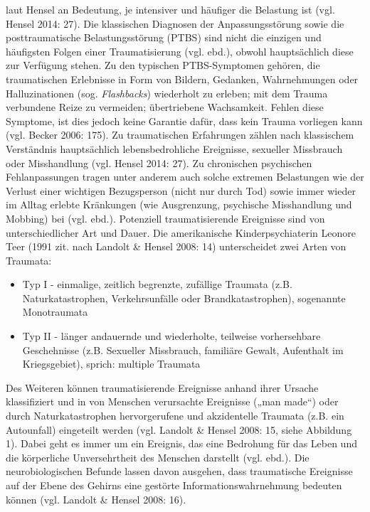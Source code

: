 laut Hensel an Bedeutung, je intensiver und häufiger die Belastung ist (vgl. Hensel 2014: 27). Die klassischen Diagnosen der Anpassungsstörung sowie die posttraumatische Belastungsstörung (PTBS) sind nicht die einzigen und häufigsten Folgen einer Traumatisierung (vgl. ebd.), obwohl hauptsächlich diese zur Verfügung stehen. Zu den typischen PTBS-Symptomen gehören, die traumatischen Erlebnisse in Form von Bildern, Gedanken, Wahrnehmungen oder Halluzinationen (sog. \textit{Flashbacks}) wiederholt zu erleben; mit dem Trauma verbundene Reize zu vermeiden; übertriebene Wachsamkeit. Fehlen diese Symptome, ist dies jedoch keine Garantie dafür, dass kein Trauma vorliegen kann (vgl. Becker 2006: 175). Zu traumatischen Erfahrungen zählen nach klassischem Verständnis hauptsächlich lebensbedrohliche Ereignisse, sexueller Missbrauch oder Misshandlung (vgl. Hensel 2014: 27). Zu chronischen psychischen Fehlanpassungen tragen unter anderem auch solche extremen Belastungen wie der Verlust einer wichtigen Bezugsperson (nicht nur durch Tod) sowie immer wieder im Alltag erlebte Kränkungen (wie Ausgrenzung, psychische Misshandlung und Mobbing) bei (vgl. ebd.). Potenziell traumatisierende Ereignisse sind von unterschiedlicher Art und Dauer. Die amerikanische Kinderpsychiaterin Leonore Teer (1991 zit. nach Landolt \& Hensel 2008: 14) unterscheidet zwei Arten von Traumata:

\begin{itemize}[noitemsep]
\item Typ I - einmalige, zeitlich begrenzte, zufällige Traumata (z.B. Naturkatastrophen, Verkehrsunfälle oder Brandkatastrophen), sogenannte Monotraumata
\item Typ II - länger andauernde und wiederholte, teilweise vorhersehbare Geschehnisse (z.B. Sexueller Missbrauch, familiäre Gewalt, Aufenthalt im Kriegsgebiet), sprich: multiple Traumata
\end{itemize}

Des Weiteren können traumatisierende Ereignisse anhand ihrer Ursache klassifiziert und in von Menschen verursachte Ereignisse („man made“) oder durch Naturkatastrophen hervorgerufene und akzidentelle Traumata (z.B. ein Autounfall) eingeteilt werden (vgl. Landolt \& Hensel 2008: 15, siehe Abbildung 1). Dabei geht es immer um ein Ereignis, das eine Bedrohung für das Leben und die körperliche Unversehrtheit des Menschen darstellt (vgl. ebd.). Die neurobiologischen Befunde lassen davon ausgehen, dass traumatische Ereignisse auf der Ebene des Gehirns eine gestörte Informationswahrnehmung bedeuten können (vgl. Landolt \& Hensel 2008: 16).

